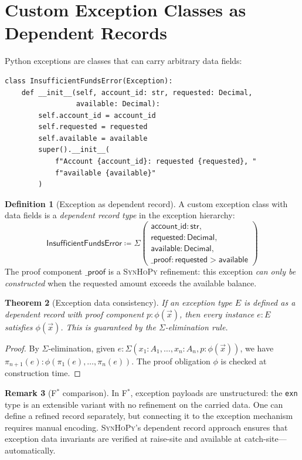 \documentclass[11pt,a4paper]{report}
\theoremstyle{definition}
\newtheorem{definition}{Definition}[chapter]
\newtheorem{remark}[definition]{Remark}
\theoremstyle{plain}
\newtheorem{theorem}[definition]{Theorem}
\newcommand{\defeq}{\coloneqq}
\newcommand{\fstar}{F$^{*}$}
\newcommand{\synhopy}{\textsc{SynHoPy}}
\begin{document}
\section{Custom Exception Classes as Dependent Records}

Python exceptions are classes that can carry arbitrary data fields:
\begin{lstlisting}[style=python]
class InsufficientFundsError(Exception):
    def __init__(self, account_id: str, requested: Decimal,
                 available: Decimal):
        self.account_id = account_id
        self.requested = requested
        self.available = available
        super().__init__(
            f"Account {account_id}: requested {requested}, "
            f"available {available}"
        )
\end{lstlisting}

\begin{definition}[Exception as dependent record]
A custom exception class with data fields is a \emph{dependent record type}
in the exception hierarchy:
\[
  \mathsf{InsufficientFundsError} \defeq \Sigma\!\left(
    \begin{array}{l}
      \mathsf{account\_id} : \mathsf{str}, \\
      \mathsf{requested} : \mathsf{Decimal}, \\
      \mathsf{available} : \mathsf{Decimal}, \\
      \mathsf{\_proof} : \mathsf{requested} > \mathsf{available}
    \end{array}
  \right)
\]
The proof component $\mathsf{\_proof}$ is a \synhopy{} refinement:
this exception \emph{can only be constructed} when the requested amount
exceeds the available balance.
\end{definition}

\begin{theorem}[Exception data consistency]
If an exception type $E$ is defined as a dependent record with proof
component $p : \phi(\vec{x})$, then every instance $e : E$ satisfies
$\phi(\vec{x})$.  This is guaranteed by the $\Sigma$-elimination rule.
\end{theorem}
\begin{proof}
By $\Sigma$-elimination, given $e : \Sigma(x_1 : A_1, \ldots, x_n : A_n,
p : \phi(\vec{x}))$, we have $\pi_{n+1}(e) : \phi(\pi_1(e), \ldots,
\pi_n(e))$.  The proof obligation $\phi$ is checked at construction time.
\end{proof}

\begin{remark}[\fstar{} comparison]
In \fstar{}, exception payloads are unstructured: the \lstinline[style=fstar]|exn|
type is an extensible variant with no refinement on the carried data.
One can define a refined record separately, but connecting it to the exception
mechanism requires manual encoding.  \synhopy{}'s dependent record approach
ensures that exception data invariants are verified at raise-site and
available at catch-site---automatically.
\end{remark}
\end{document}
